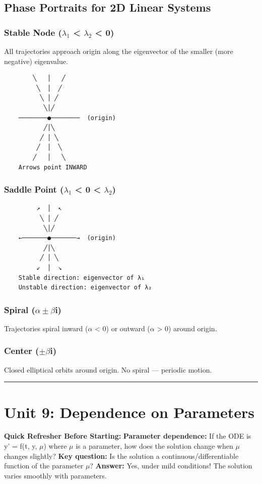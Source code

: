 \documentclass[12pt,a4paper,openany]{book}
\begin{document}
{{\subsection{Phase Portraits for 2D Linear Systems}

\subsubsection{Stable Node ($\lambda_1$ < $\lambda_2$ < 0)}
All trajectories approach origin along the eigenvector of the smaller (more negative) eigenvalue.

\begin{verbatim}
        ╲   │   ╱
         ╲  │  ╱
          ╲ │ ╱
           ╲│╱
    ────────●────────  (origin)
           ╱│╲
          ╱ │ ╲
         ╱  │  ╲
        ╱   │   ╲
    Arrows point INWARD
\end{verbatim}

\subsubsection{Saddle Point ($\lambda_1$ < 0 < $\lambda_2$)}
\begin{verbatim}
         ↗  │  ↖
          ╲ │ ╱
           ╲│╱
    ←───────●───────→  (origin)
           ╱│╲
          ╱ │ ╲
         ↙  │  ↘
    Stable direction: eigenvector of λ₁
    Unstable direction: eigenvector of λ₂
\end{verbatim}

\subsubsection{Spiral ($\alpha\pm\beta$i)}
Trajectories spiral inward ($\alpha$ < 0) or outward ($\alpha$ > 0) around origin.

\subsubsection{Center ($\pm\beta$i)}
Closed elliptical orbits around origin. No spiral — periodic motion.

\bigskip\noindent\rule{\textwidth}{0.4pt}\bigskip

\section{Unit 9: Dependence on Parameters}

\begin{prereqbox}
 \textbf{Quick Refresher Before Starting:}
\textbf{Parameter dependence:} If the ODE is y' = f(t, y, $\mu$) where $\mu$ is a parameter, how does the solution change when $\mu$ changes slightly?
\textbf{Key question:} Is the solution a continuous/differentiable function of the parameter $\mu$?
\textbf{Answer:} Yes, under mild conditions! The solution varies smoothly with parameters.
\end{prereqbox}


}}
\end{document}
